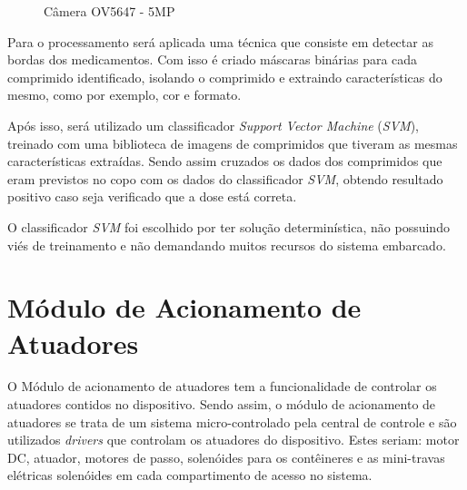     \begin{figure}[H]
    \centering
    \hspace{0.1\textwidth}
    \caption{Câmera OV5647 - 5MP}\label{fig:camera_process}
    \end{figure}
    
    Para o processamento será aplicada uma técnica que consiste em detectar as bordas dos medicamentos. Com isso é criado máscaras binárias para cada comprimido identificado, isolando o comprimido e extraindo características do mesmo, como por exemplo, cor e formato.
    
    Após isso, será utilizado um classificador \textit{Support Vector Machine} (\textit{SVM}), treinado com uma biblioteca de imagens de comprimidos que tiveram as mesmas características extraídas. Sendo assim cruzados os dados dos comprimidos que eram previstos no copo com os dados do classificador \textit{SVM}, obtendo resultado positivo caso seja verificado que a dose está correta. 
    
    O classificador \textit{SVM} foi escolhido por ter solução determinística, não possuindo viés de treinamento e não demandando muitos recursos do sistema embarcado. 

\section{Módulo de Acionamento de Atuadores}
     
    O Módulo de acionamento de atuadores tem a funcionalidade de controlar os atuadores contidos no dispositivo. Sendo assim, o módulo de acionamento de atuadores se trata de um sistema micro-controlado pela central de controle e são utilizados \textit{drivers} que controlam os atuadores do dispositivo. Estes seriam: motor DC, atuador, motores de passo, solenóides para os contêineres e as mini-travas elétricas solenóides em cada compartimento de acesso no sistema. 

